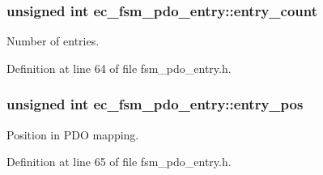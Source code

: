 \subsubsection[{entry\-\_\-count}]{\setlength{\rightskip}{0pt plus 5cm}unsigned int ec\-\_\-fsm\-\_\-pdo\-\_\-entry\-::entry\-\_\-count}\label{structec__fsm__pdo__entry_aa35c32c568b656a84a7931ac415ee15d}


Number of entries. 



Definition at line 64 of file fsm\-\_\-pdo\-\_\-entry.\-h.

\subsubsection[{entry\-\_\-pos}]{\setlength{\rightskip}{0pt plus 5cm}unsigned int ec\-\_\-fsm\-\_\-pdo\-\_\-entry\-::entry\-\_\-pos}\label{structec__fsm__pdo__entry_a9766f580ea3c1ee6fffa28979e9a4087}


Position in P\-D\-O mapping. 



Definition at line 65 of file fsm\-\_\-pdo\-\_\-entry.\-h.

